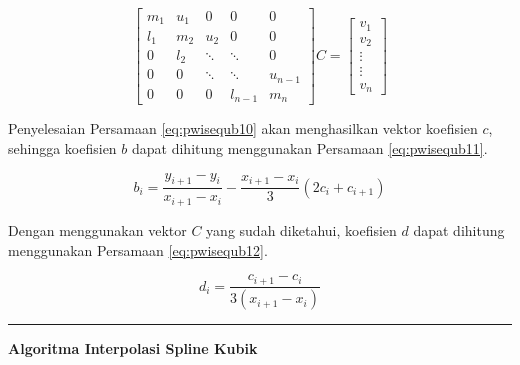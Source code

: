 \documentclass[]{book}
\theoremstyle{definition}
\theoremstyle{definition}
\theoremstyle{definition}
\theoremstyle{remark}
\begin{document}
\begin{equation}
\begin{bmatrix}
     m_{1} & u_{1} & 0      &     0  & 0             \\[0.3em]
     l_{1} & m_{2} & u_{2}  & 0      & 0             \\[0.3em]
     0     & l_{2} & \ddots & \ddots & 0             \\[0.3em]
     0     & 0     & \ddots & \ddots & u_{n-1}       \\[0.3em]
     0     & 0     & 0      &l_{n-1} & m_{n}
     \end{bmatrix}
C
= \begin{bmatrix}
     v_1                                          \\[0.3em]
     v_2                                          \\[0.3em]
     \vdots                                       \\[0.3em]
     \vdots                                       \\[0.3em]
     v_n                                       
     \end{bmatrix}
  \label{eq:pwisequb10}
\end{equation}

Penyelesaian Persamaan \eqref{eq:pwisequb10} akan menghasilkan vektor koefisien \(c\), sehingga koefisien \(b\) dapat dihitung menggunakan Persamaan \eqref{eq:pwisequb11}.

\begin{equation}
b_i=\frac{y_{i+1}-y_i}{x_{i+1}-x_i}-\frac{x_{i+1}-x_i}{3}\left(2c_i+c_{i+1}\right)
  \label{eq:pwisequb11}
\end{equation}

Dengan menggunakan vektor \(C\) yang sudah diketahui, koefisien \(d\) dapat dihitung menggunakan Persamaan \eqref{eq:pwisequb12}.

\begin{equation}
d_i=\frac{c_{i+1}-c_i}{3\left(x_{i+1}-x_i\right)}
  \label{eq:pwisequb12}
\end{equation}

\begin{center}\rule{0.5\linewidth}{\linethickness}\end{center}

\textbf{Algoritma Interpolasi Spline Kubik}
\end{document}
